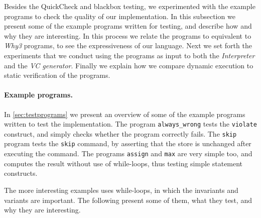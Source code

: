 Besides the QuickCheck and blackbox testing, we experimented with the example programs to check the quality of our implementation.
In this subsection we present some of the example programs written for testing, and describe how and why they are interesting. In this process we relate the programs to equivalent to \textit{Why3} programs, to see the expressiveness of our language.
Next we set forth the experiments that we conduct using the programs as input to both the \textit{Interpreter} and the \textit{VC generator}.
Finally we explain how we compare dynamic execution to static verification of the programs.

\paragraph{Example programs.}
In \cref{sec:testprograms} we present an overview of some of the example programs written to test the implementation.
The program \texttt{always\_wrong} tests the \texttt{violate} construct, and simply checks whether the program correctly fails.
The \texttt{skip} program tests the \texttt{skip} command, by asserting that the store is unchanged after executing the command.
The programs \texttt{assign} and \texttt{max} are very simple too, and computes the result without use of while-loops, thus testing simple statement constructs.

The more interesting examples uses while-loops, in which the invariants and variants are important. The following present some of them, what they test, and why they are interesting.


